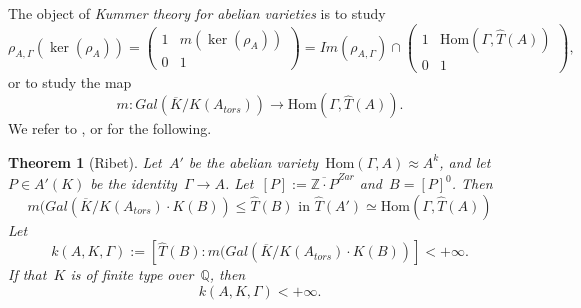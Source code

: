 \documentclass[12pt]{amsart}
\newtheorem{theorem}{Theorem}[section]
\newtheorem{corollary}[theorem]{Corollary}
\newcommand{\Hom}{\mbox{Hom}}
\newcommand{\Z}{{\mathbb Z}}
\newcommand{\Q}{{\mathbb Q}}
\newcommand{\ol}{\overline}
\newcommand{\wh}{\widehat}
\newcommand{\tens}{\otimes}
\begin{document}
The object of \emph{Kummer theory for abelian varieties} is to study
\[
\rho_{A,\Gamma}(\ker(\rho_A))=
\begin{pmatrix}
1&m(\ker(\rho_A))\\
0& 1
\end{pmatrix}
=
Im(\rho_{A,\Gamma})
\cap
\begin{pmatrix}
1&\Hom(\Gamma,\wh{T}(A))\\
0& 1
\end{pmatrix},
\]
or to study the map
\begin{equation}\label{eq:Kummer m}
m:Gal(\ol{K}/K(A_{tors}))\to \Hom(\Gamma,\wh{T}(A)).
\end{equation}
We refer to \cite{Ribet}, \cite[App. 2]{Hindry} or \cite[{\S\S} 1--2]{Bertrand} for the following.
\begin{theorem}[Ribet]\label{thm:Kummer}
Let~$A'$ be the abelian variety~$\Hom(\Gamma,A)\approx A^k$, and let~$P\in A'(K)$ be the identity~$\Gamma\to A$.
Let~$[P]:=\ol{\Z\cdot P}^{Zar}$ and~$B=[P]^0$. Then
\[
m(Gal(\ol{K}/K(A_{tors})\cdot K(B))\leq \wh{T}(B)\text{ in }\wh{T}(A')\simeq \Hom(\Gamma,\wh{T}(A))
\]
Let
\begin{equation}\label{}
k(A,K,\Gamma):=[\wh{T}(B):m(Gal(\ol{K}/K(A_{tors})\cdot K(B))]<+\infty.
\end{equation}
If that~$K$ is of finite type over~$\Q$,
then
\[
k(A,K,\Gamma)<+\infty.
\]
\end{theorem}

%
%
%
\end{document}
